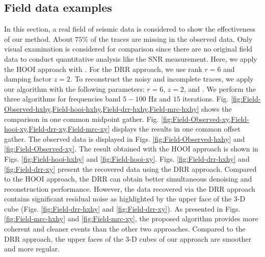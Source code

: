 
\subsection{Field data examples}

In this section, a real field of seismic data is considered to show the effectiveness of our  method. About $75\%$ of the traces are missing in the observed data. Only visual examination is considered for comparison since there are no original field data to conduct quantitative analysis like the SNR measurement. Here, we apply the HOOI approach with  . For the DRR approach, we use rank $r=6$ and damping factor $z=2$. To reconstruct the noisy and incomplete traces, we apply our  algorithm with the following parameters: $r=6$, $z=2$, and . We perform the three algorithms for frequencies band $5 - 100$ Hz and $15$ iterations. Fig. \ref{fig:Field-Observed-hxhy,Field-hooi-hxhy,Field-drr-hxhy,Field-mrc-hxhy} shows the comparison in one common midpoint gather. Fig. \ref{fig:Field-Observed-xy,Field-hooi-xy,Field-drr-xy,Field-mrc-xy} displays the results in one common offset gather. The observed data is displayed in Figs. \ref{fig:Field-Observed-hxhy} and \ref{fig:Field-Observed-xy}. The result obtained with the HOOI approach is shown in Figs. \ref{fig:Field-hooi-hxhy} and \ref{fig:Field-hooi-xy}. Figs. \ref{fig:Field-drr-hxhy} and \ref{fig:Field-drr-xy} present the recovered data using the DRR approach. Compared to the HOOI approach, the DRR can obtain better simultaneous denoising and reconstruction performance. However, the data recovered via the DRR approach contains significant residual noise as highlighted by the upper face of the 3-D cube (Figs. \ref{fig:Field-drr-hxhy} and \ref{fig:Field-drr-xy}). As presented in Figs. \ref{fig:Field-mrc-hxhy} and \ref{fig:Field-mrc-xy}, the proposed  algorithm provides more coherent and cleaner events than the other two approaches. Compared to the DRR approach, the upper faces of the 3-D cubes of our  approach are smoother and more regular.


